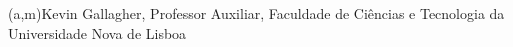 %
%
%
%
(a,m){Kevin Gallagher, Professor Auxiliar, Faculdade de Ciências e Tecnologia da Universidade Nova de Lisboa}



%
%
%
%
